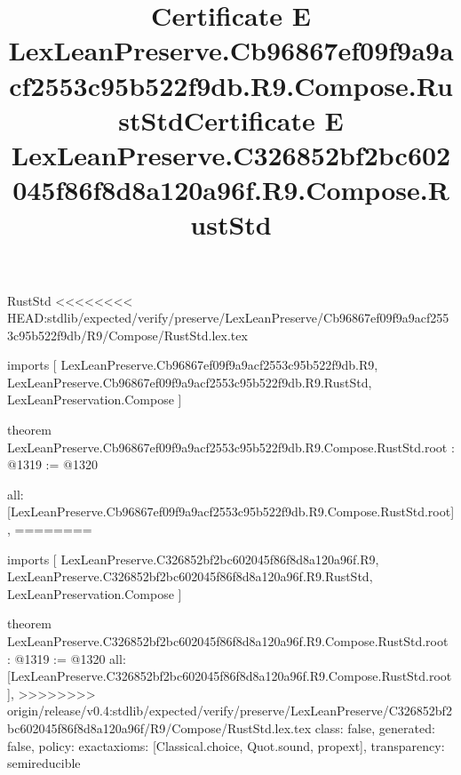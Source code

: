 \begin{lexlean}{RustStd}
<<<<<<<< HEAD:stdlib/expected/verify/preserve/LexLeanPreserve/Cb96867ef09f9a9acf2553c95b522f9db/R9/Compose/RustStd.lex.tex
\title{Certificate E LexLeanPreserve.Cb96867ef09f9a9acf2553c95b522f9db.R9.Compose.RustStd}
\begin{coremodule}
imports [
  LexLeanPreserve.Cb96867ef09f9a9acf2553c95b522f9db.R9,
  LexLeanPreserve.Cb96867ef09f9a9acf2553c95b522f9db.R9.RustStd,
  LexLeanPreservation.Compose
]

theorem LexLeanPreserve.Cb96867ef09f9a9acf2553c95b522f9db.R9.Compose.RustStd.root : @1319 := @1320 {
  all: [LexLeanPreserve.Cb96867ef09f9a9acf2553c95b522f9db.R9.Compose.RustStd.root],
========
\title{Certificate E LexLeanPreserve.C326852bf2bc602045f86f8d8a120a96f.R9.Compose.RustStd}
\begin{coremodule}
imports [
  LexLeanPreserve.C326852bf2bc602045f86f8d8a120a96f.R9,
  LexLeanPreserve.C326852bf2bc602045f86f8d8a120a96f.R9.RustStd,
  LexLeanPreservation.Compose
]

theorem LexLeanPreserve.C326852bf2bc602045f86f8d8a120a96f.R9.Compose.RustStd.root : @1319 := @1320 {
  all: [LexLeanPreserve.C326852bf2bc602045f86f8d8a120a96f.R9.Compose.RustStd.root],
>>>>>>>> origin/release/v0.4:stdlib/expected/verify/preserve/LexLeanPreserve/C326852bf2bc602045f86f8d8a120a96f/R9/Compose/RustStd.lex.tex
  class: false,
  generated: false,
  policy: exact{axioms: [Classical.choice, Quot.sound, propext]},
  transparency: semireducible
}


\end{coremodule}}
\end{coremodule}
\end{lexlean}
